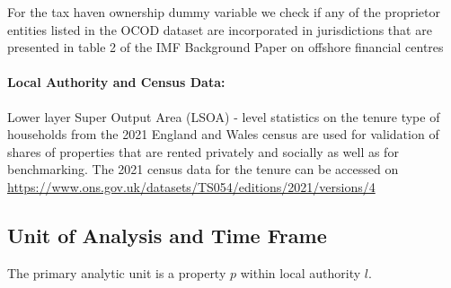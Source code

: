 \documentclass[12pt]{article}
\begin{document}
        For the tax haven ownership dummy variable we check if any of the proprietor entities listed in the OCOD dataset are incorporated in jurisdictions that are presented in table 2 of the IMF Background Paper on offshore financial centres \autocite{imf2000offshore}


    
\paragraph{Local Authority and Census Data:} 
    
Lower layer Super Output Area (LSOA) - level statistics on the tenure type of households from the 2021 England and Wales census are used for validation of shares of properties that are rented privately and socially as well as for benchmarking. The 2021 census data for the tenure can be accessed on \url{https://www.ons.gov.uk/datasets/TS054/editions/2021/versions/4}

  
\subsection{Unit of Analysis and Time Frame}

The primary analytic unit is a property $p$ within local authority $l$.
\end{document}
